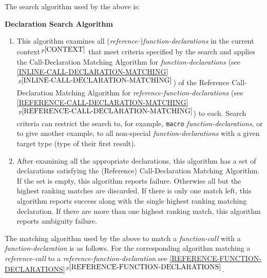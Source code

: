 \documentclass[12pt]{article}
\newcommand{\itemref}[1]{\ref{#1}$\,^{p\pageref{#1}}$}
\newcommand{\pagnote}[1]{$\,^{p\pageref{#1}}$}
\begin{document}
\bigskip

The search algorithm used by the above is:

\bigskip

\centerline{\bf Declaration Search Algorithm}
\begin{enumerate}
\item This algorithm examines all ({\em reference-}){\em function-declarations}
in the current context\pagnote{CONTEXT} that meet criteria specified by the
search and applies the
Call-Declaration Matching Algorithm for
{\em function-declarations} (see \itemref{INLINE-CALL-DECLARATION-MATCHING})
of the Reference Call-Declaration Matching Algorithm for
{\em reference-function-declarations}
(see \itemref{REFERENCE-CALL-DECLARATION-MATCHING})
to each.
Search criteria can restrict the search to, for example, {\tt macro}
{\em function-declarations}, or to give another example,
to all non-special {\em function-declarations} with a given target type
(type of their first result).
\item
After examining all the appropriate declarations, this algorithm has
a set of declarations satisfying the (Reference)
Call-Declaration Matching Algorithm.
If the set is empty, this algorithm reports failure.  Otherwise all but
the highest ranking matches are discarded.  If there is only one match
left, this algorithm reports success along with the single highest
ranking matching declaration.
If there are more than one highest ranking match, this algorithm reports
ambiguity failure.

\end{enumerate}

The matching algorithm used by the above to match a {\em function-call}
with a {\em function-declara\-tion} is as follows.  For the corresponding
algorithm matching a {\em reference-call} to a
{\em reference-function-declaration} see
\itemref{REFERENCE-FUNCTION-DECLARATIONS}.

\bigskip
\end{document}
